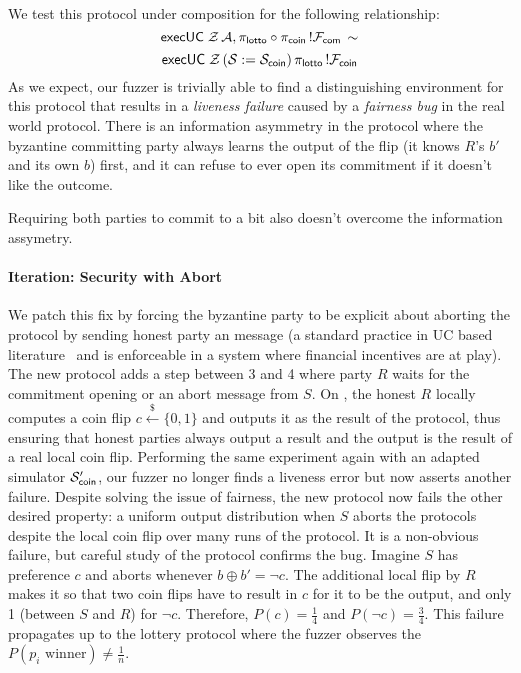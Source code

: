 We test this protocol under composition for the following relationship:
$${\mathsf {execUC}} \; \mathcal{Z} \, \mathcal{A}, \pi_{{\mathsf {lotto}}} \circ \pi_{{\mathsf {coin}}} \, !\mathcal{F}_{{\mathsf {com}}} \, \sim$$ 
$${\mathsf {execUC}} \; \mathcal{Z} \, (\mathcal{S} := \mathcal{S}_{{\mathsf {coin}}}) \, \pi_{{\mathsf {lotto}}} \, !\mathcal{F}_{{\mathsf {coin}}}$$
As we expect, our fuzzer is trivially able to find a distinguishing environment
for this protocol that results in a \emph{liveness failure} caused by a
\emph{fairness bug} in the real world protocol. There is an information asymmetry 
in the protocol where the byzantine committing party always learns the output of the flip
(it knows $R$'s $b'$ and its own $b$) first, and it can refuse to ever open its commitment
if it doesn't like the outcome.

Requiring both parties to commit to a bit also doesn't overcome the information assymetry.

\paragraph{Iteration: Security with Abort}
We patch this fix by forcing the byzantine party to be explicit about aborting the protocol
by sending
honest party an  message (a standard practice in UC based literature~\cite{common, abort, defs}
and is enforceable in a system where financial incentives are at play).  
The new protocol adds a step between 3 and 4 where party $R$ waits for
the commitment opening or an abort message from $S$.  On , the honest
$R$ locally computes a coin flip $c \xleftarrow{\$} \{0,1\}$ and outputs it as
the result of the protocol, thus ensuring that honest parties always output a
result and the output is the result of a real local coin flip.
Performing the same experiment again with an adapted simulator
$\mathcal{S}'_{{\mathsf {coin}}}$, our fuzzer no longer finds a liveness error but now asserts another failure.  Despite solving the issue
of fairness, the new protocol now fails the other desired property: a uniform 
output distribution when $S$ aborts the protocols despite the local coin flip over many runs of the protocol.
It is a non-obvious failure, but careful study of the protocol
confirms the bug. Imagine $S$ has 
preference $c$ and aborts whenever $b \oplus b' = \neg c$.
The additional local flip by $R$ makes it so that two coin flips have to result in $c$ for it to be the output, and only 1 (between $S$ and $R$) for $\neg c$.
Therefore, $P(c) = \frac{1}{4}$ and $P(\neg c) = \frac{3}{4}$.
This failure propagates up to the lottery protocol where the fuzzer observes the $P(p_i \text{ winner}) \neq \frac{1}{n}$.

